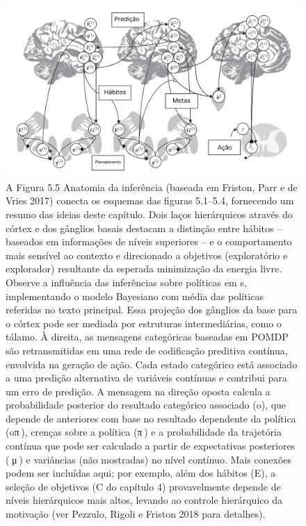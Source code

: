 \documentclass[
  12pt,
]{book}
\begin{document}
\begin{figure}
\centering
\includegraphics{images/Figura_5_5.png}
\caption{A Figura 5.5 Anatomia da inferência (baseada em Friston, Parr e de Vries 2017) conecta os esquemas das figuras 5.1--5.4, fornecendo um resumo das ideias deste capítulo. Dois laços hierárquicos através do córtex e dos gânglios basais destacam a distinção entre hábitos -- baseados em informações de níveis superiores -- e o comportamento mais sensível ao contexto e direcionado a objetivos (exploratório e explorador) resultante da esperada minimização da energia livre. Observe a influência das inferências sobre políticas em s, implementando o modelo Bayesiano com média das políticas referidas no texto principal. Essa projeção dos gânglios da base para o córtex pode ser mediada por estruturas intermediárias, como o tálamo. À direita, as mensagens categóricas baseadas em POMDP são retransmitidas em uma rede de codificação preditiva contínua, envolvida na geração de ação. Cada estado categórico está associado a uma predição alternativa de variáveis \hspace{0pt}\hspace{0pt}contínuas e contribui para um erro de predição. A mensagem na direção oposta calcula a probabilidade posterior do resultado categórico associado (o), que depende de anteriores com base no resultado dependente da política (oπ ), crenças sobre a política (π ) e a probabilidade da trajetória contínua que pode ser calculado a partir de expectativas posteriores (  μ ) e variâncias (não mostradas) no nível contínuo. Mais conexões podem ser incluídas aqui; por exemplo, além dos hábitos (E), a seleção de objetivos (C do capítulo 4) provavelmente depende de níveis hierárquicos mais altos, levando ao controle hierárquico da motivação (ver Pezzulo, Rigoli e Friston 2018 para detalhes).}
\end{figure}
\end{document}

